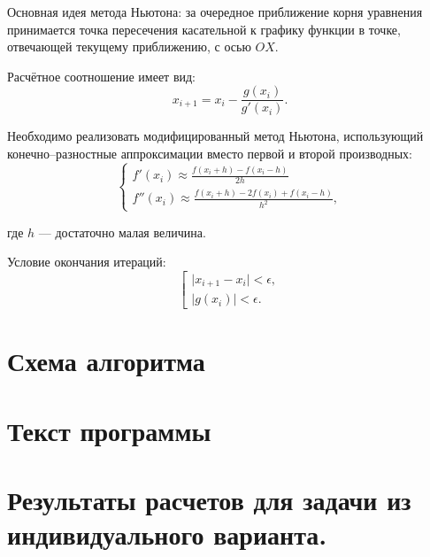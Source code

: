 Основная идея метода Ньютона: за очередное приближение корня уравнения принимается точка пересечения касательной к графику функции в точке, отвечающей
текущему приближению, с осью $OX$.

Расчётное соотношение имеет вид:
\begin{equation*}
    x_{i+1} = x_i - \frac{g(x_i)}{g'(x_i)}.
\end{equation*}

Необходимо реализовать модифицированный метод Ньютона, использующий конечно--разностные аппроксимации вместо первой и второй производных:
\begin{equation*}
    \begin{cases}
        f'(x_i) \approx \frac{f(x_i + h) - f(x_i - h)}{2h} \\
        f''(x_i) \approx \frac{f(x_i + h) - 2f(x_i) + f(x_i - h)}{h^2},
    \end{cases}
\end{equation*}

где $h$ --- достаточно малая величина. 

Условие окончания итераций:
\begin{equation*}
    \left[
    \begin{array}{ll}
        \lvert x_{i+1} - x_i \rvert < \epsilon, \\
        \lvert g(x_i) \rvert < \epsilon.
    \end{array}
    \right .
\end{equation*}

\newpage

\section{Схема алгоритма}


\section{Текст программы}


\section{Результаты расчетов для задачи из индивидуального варианта.}

